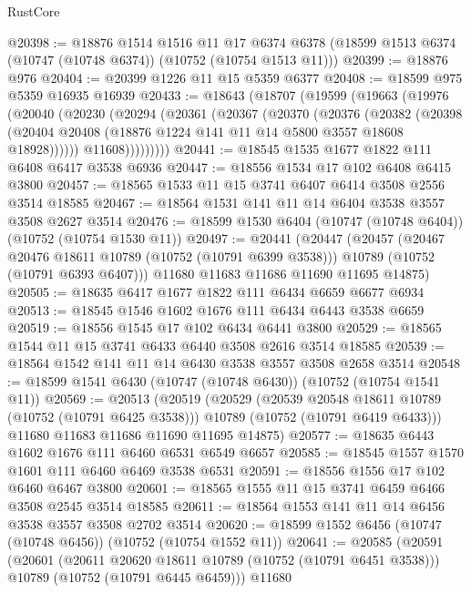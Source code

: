 \begin{lexlean}{RustCore}
\begin{coremodule}
@20398 := @18876
    @1514
    @1516
    @11
    @17
    @6374
    @6378
    (@18599 @1513 @6374 (@10747 (@10748 @6374)) (@10752 (@10754 @1513 @11)))
@20399 := @18876 @976
@20404 := @20399 @1226 @11 @15 @5359 @6377
@20408 := @18599 @975 @5359 @16935 @16939
@20433 := @18643
    (@18707
      (@19599
        (@19663
          (@19976
            (@20040
              (@20230
                (@20294
                  (@20361
                    (@20367
                      (@20370
                        (@20376
                          (@20382
                            (@20398
                              (@20404
                                @20408
                                (@18876 @1224 @141 @11 @14 @5800 @3557 @18608 @18928))))))
                      @11608)))))))))
@20441 := @18545 @1535 @1677 @1822 @111 @6408 @6417 @3538 @6936
@20447 := @18556 @1534 @17 @102 @6408 @6415 @3800
@20457 := @18565 @1533 @11 @15 @3741 @6407 @6414 @3508 @2556 @3514 @18585
@20467 := @18564 @1531 @141 @11 @14 @6404 @3538 @3557 @3508 @2627 @3514
@20476 := @18599 @1530 @6404 (@10747 (@10748 @6404)) (@10752 (@10754 @1530 @11))
@20497 := @20441
    (@20447
      (@20457
        (@20467 @20476 @18611 @10789 (@10752 (@10791 @6399 @3538)))
        @10789
        (@10752 (@10791 @6393 @6407)))
      @11680
      @11683
      @11686
      @11690
      @11695
      @14875)
@20505 := @18635 @6417 @1677 @1822 @111 @6434 @6659 @6677 @6934
@20513 := @18545 @1546 @1602 @1676 @111 @6434 @6443 @3538 @6659
@20519 := @18556 @1545 @17 @102 @6434 @6441 @3800
@20529 := @18565 @1544 @11 @15 @3741 @6433 @6440 @3508 @2616 @3514 @18585
@20539 := @18564 @1542 @141 @11 @14 @6430 @3538 @3557 @3508 @2658 @3514
@20548 := @18599 @1541 @6430 (@10747 (@10748 @6430)) (@10752 (@10754 @1541 @11))
@20569 := @20513
    (@20519
      (@20529
        (@20539 @20548 @18611 @10789 (@10752 (@10791 @6425 @3538)))
        @10789
        (@10752 (@10791 @6419 @6433)))
      @11680
      @11683
      @11686
      @11690
      @11695
      @14875)
@20577 := @18635 @6443 @1602 @1676 @111 @6460 @6531 @6549 @6657
@20585 := @18545 @1557 @1570 @1601 @111 @6460 @6469 @3538 @6531
@20591 := @18556 @1556 @17 @102 @6460 @6467 @3800
@20601 := @18565 @1555 @11 @15 @3741 @6459 @6466 @3508 @2545 @3514 @18585
@20611 := @18564 @1553 @141 @11 @14 @6456 @3538 @3557 @3508 @2702 @3514
@20620 := @18599 @1552 @6456 (@10747 (@10748 @6456)) (@10752 (@10754 @1552 @11))
@20641 := @20585
    (@20591
      (@20601
        (@20611 @20620 @18611 @10789 (@10752 (@10791 @6451 @3538)))
        @10789
        (@10752 (@10791 @6445 @6459)))
      @11680

\end{coremodule}
\end{lexlean}

